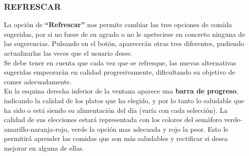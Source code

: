 \subsubsection{REFRESCAR}
La opción de \textbf{“Refrescar”} nos permite cambiar las tres opciones de comida sugeridas, por si no fuese de su agrado o no le apeteciese en concreto ninguna de las sugerencias. Pulsando en el botón, aparecerán otras tres diferentes, pudiendo actualizarlas las veces que el usuario desee.\\

Se debe tener en cuenta que cada vez que se refresque, las nuevas alternativas sugeridas empeorarán en calidad progresivamente, dificultando su objetivo de comer adecuadamente.\\

En la esquina derecha inferior de la ventana aparece una \textbf{barra de progreso}, indicando la calidad de los platos que ha elegido, y por lo tanto lo saludable que ha sido o está siendo su alimentación del día (varía con cada selección). La calidad de sus elecciones estará representada con los colores del semáforo verde-amarillo-naranja-rojo, verde la opción mas adecuada y rojo la peor. Esto le permitirá aprender las comidas que son más saludables y rectificar si desea mejorar en alguna de ellas.\\
\pagebreak

